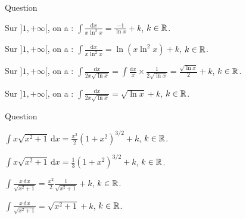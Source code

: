 \begin{multi}[multiple,feedback=
{Avec \(u=\ln x\), on aura : \(\displaystyle \mathrm{d}u=\frac{\mathrm{d}x}{x}\). D'où
\[\int \frac{\mathrm{d}x}{x\ln ^2x}=\int \frac{\mathrm{d}u}{u^2}=\frac{-1}{u}+k=\frac{-1}{\ln x}+k,\; k\in \Rr\]
et
\[\int \frac{\mathrm{d}x}{2x\sqrt{\ln x}}=\int \frac{\mathrm{d}u}{2\sqrt{u}}=\sqrt{u}+k=\sqrt{\ln x}+k,\; k\in \Rr.\]
}]{Question}
    \item* Sur \(]1,+\infty[\), on a : \(\displaystyle \int \frac{\mathrm{d}x}{x\ln ^2x}=\frac{-1}{\ln x}+k\), \(k\in \mathbb{R}\).
    \item Sur \(]1,+\infty[\), on a : \(\displaystyle \int \frac{\mathrm{d}x}{x\ln ^2x}=\ln (x\ln ^2x)+k\), \(k\in \mathbb{R}\).
    \item Sur \(]1,+\infty[\), on a : \(\displaystyle \int \frac{\mathrm{d}x}{2x\sqrt{\ln x}}=\int \frac{\mathrm{d}x}{x}\times \frac{1}{2\sqrt{\ln x}}=\frac{\sqrt{\ln x}}{2}+k\), \(k\in \mathbb{R}\).
    \item* Sur \(]1,+\infty[\), on a : \(\displaystyle \int \frac{\mathrm{d}x}{2x\sqrt{\ln x}}=\sqrt{\ln x}+k\), \(k\in \mathbb{R}\).
\end{multi}


\begin{multi}[multiple,feedback=
{Avec \(u=x^2+1\), on a \(\mathrm{d}u=2x\mathrm{d}x\). D'où
\[\int x\sqrt{x^2+1}\mathrm{d}x=\frac{1}{2}\int \sqrt{u}\mathrm{d}u=\frac{u^{3/2}}{3}+k=\frac{1}{3}(1+x^2)^{3/2}+k,\; k\in \Rr,\]
et
\[\int \frac{x\mathrm{d}x}{\sqrt{x^2+1}}=\int \frac{\mathrm{d}u}{2\sqrt{u}}=\sqrt{u}+k=\sqrt{x^2+1}+k,\; k\in \Rr.\]
}]{Question}
    \item \(\displaystyle \int x\sqrt{x^2+1}\, \mathrm{d}x=\frac{x^2}{2}(1+x^2)^{3/2}+k\), \(k\in \mathbb{R}\).
    \item* \(\displaystyle \int x\sqrt{x^2+1}\, \mathrm{d}x=\frac{1}{3}(1+x^2)^{3/2}+k\), \(k\in \mathbb{R}\).
    \item \(\displaystyle \int \frac{x\, \mathrm{d}x}{\sqrt{x^2+1}}=\frac{x^2}{2}\frac{1}{\sqrt{x^2+1}}+k\), \(k\in \mathbb{R}\).
    \item* \(\displaystyle \int \frac{x\, \mathrm{d}x}{\sqrt{x^2+1}}=\sqrt{x^2+1}+k\), \(k\in \mathbb{R}\).
\end{multi}


